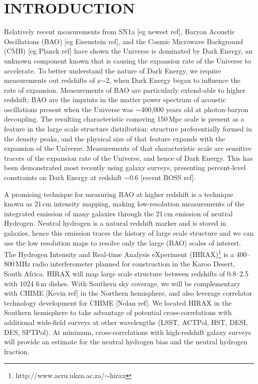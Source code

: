 \documentclass[]{spie}  %
\begin{document}
\section{INTRODUCTION}
\label{sec:intro}  %

Relatively recent measurements from SN1a [eg newest ref], Baryon Acoustic Oscillations (BAO) [eg Eisenstein ref], and the Cosmic Microwave Background (CMB) [eg Planck ref] have shown the Universe is dominated by Dark Energy, an unknown component known that is causing the expansion rate of the Universe to accelerate. To better understand the nature of Dark Energy, we require measurements out redshifts of z$\sim$2, when Dark Energy began to influence the rate of expansion. Measurements of BAO are particularly extend-able to higher redshift; BAO are the imprints in the matter power spectrum of acoustic oscillations present when the Universe was $\sim$400,000 years old at photon-baryon decoupling. The resulting characteristic comoving 150\,Mpc scale is present as a feature in the large scale structure distribution: structure preferentially formed in the density peaks, and the physical size of that feature expands with the expansion of the Universe. Measurements of that characteristic scale are sensitive tracers of the expansion rate of the Universe, and hence of Dark Energy. This has been demonstrated most recently using galaxy surveys, presenting percent-level constraints on Dark Energy at redshift $\sim$0.6 [recent BOSS ref]. \newline

A promising technique for measuring BAO at higher redshift is a technique known as 21\,cm intensity mapping, making low-resolution measurements of the integrated emission of many galaxies through the 21\,cm emission of neutral Hydrogen. Neutral hydrogen is a natural redshift marker and is stored in galaxies, hence this emission traces the history of large scale structure and we can use the low resolution maps to resolve only the large (BAO) scales of interest. The Hydrogen Intensity and Real-time Analysis eXperiment (HIRAX)\footnote{http:\//\//www.acru.ukzn.ac.za\//$\sim$hirax} is a 400--800\,MHz radio interferometer planned for construction in the Karoo Desert, South Africa. HIRAX will map large scale structure between redshifts of 0.8--2.5 with 1024 6\,m dishes. With Southern sky coverage, we will be complementary with CHIME [Kevin ref] in the Northern hemisphere, and also leverage correlator technology development for CHIME [Nolan ref]. We located HIRAX in the Southern hemisphere to take advantage of potential cross-correlations with additional wide-field surveys at other wavelengths (LSST, ACTPol, HST, DESI, DES, SPTPol). At minimum, cross-correlations with high-redshift galaxy surveys will provide an estimate for the neutral hydrogen bias and the neutral hydrogen fraction. \newline
\end{document}
